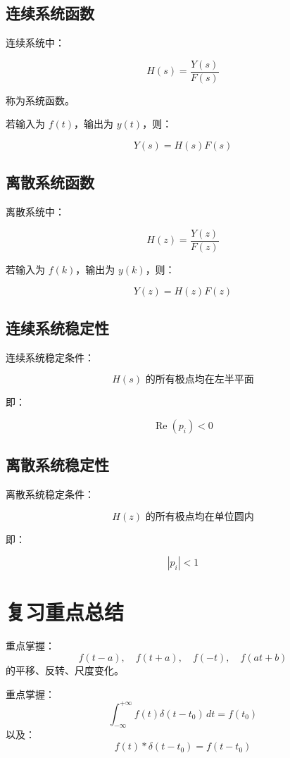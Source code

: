\documentclass[UTF8]{ctexart}
\begin{document}
\subsection{连续系统函数}

连续系统中：

\[
H(s)=\frac{Y(s)}{F(s)}
\]

称为系统函数。

若输入为 $f(t)$，输出为 $y(t)$，则：

\[
Y(s)=H(s)F(s)
\]

\subsection{离散系统函数}

离散系统中：

\[
H(z)=\frac{Y(z)}{F(z)}
\]

若输入为 $f(k)$，输出为 $y(k)$，则：

\[
Y(z)=H(z)F(z)
\]

\subsection{连续系统稳定性}

连续系统稳定条件：

\[
H(s)\text{ 的所有极点均在左半平面}
\]

即：

\[
\operatorname{Re}(p_i)<0
\]

\subsection{离散系统稳定性}

离散系统稳定条件：

\[
H(z)\text{ 的所有极点均在单位圆内}
\]

即：

\[
|p_i|<1
\]

\section{复习重点总结}

\begin{tcolorbox}[colback=red!5!white,colframe=red!60!black,title=重点一：波形变换]
重点掌握：
\[
f(t-a),\quad f(t+a),\quad f(-t),\quad f(at+b)
\]
的平移、反转、尺度变化。
\end{tcolorbox}

\begin{tcolorbox}[colback=red!5!white,colframe=red!60!black,title=重点二：冲激函数]
重点掌握：
\[
\int_{-\infty}^{+\infty}f(t)\delta(t-t_0)\,dt=f(t_0)
\]
以及：
\[
f(t)*\delta(t-t_0)=f(t-t_0)
\]
\end{tcolorbox}
\end{document}
